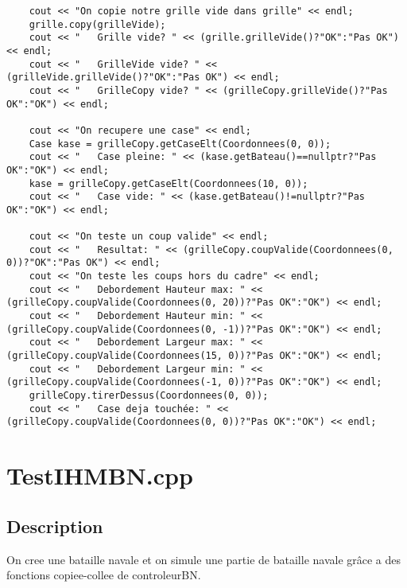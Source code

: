 \begin{lstlisting}
    cout << "On copie notre grille vide dans grille" << endl;
    grille.copy(grilleVide);
    cout << "   Grille vide? " << (grille.grilleVide()?"OK":"Pas OK") << endl;
    cout << "   GrilleVide vide? " << (grilleVide.grilleVide()?"OK":"Pas OK") << endl;
    cout << "   GrilleCopy vide? " << (grilleCopy.grilleVide()?"Pas OK":"OK") << endl;

    cout << "On recupere une case" << endl;
    Case kase = grilleCopy.getCaseElt(Coordonnees(0, 0));
    cout << "   Case pleine: " << (kase.getBateau()==nullptr?"Pas OK":"OK") << endl;
    kase = grilleCopy.getCaseElt(Coordonnees(10, 0));
    cout << "   Case vide: " << (kase.getBateau()!=nullptr?"Pas OK":"OK") << endl;

    cout << "On teste un coup valide" << endl;
    cout << "   Resultat: " << (grilleCopy.coupValide(Coordonnees(0, 0))?"OK":"Pas OK") << endl;
    cout << "On teste les coups hors du cadre" << endl;
    cout << "   Debordement Hauteur max: " << (grilleCopy.coupValide(Coordonnees(0, 20))?"Pas OK":"OK") << endl;
    cout << "   Debordement Hauteur min: " << (grilleCopy.coupValide(Coordonnees(0, -1))?"Pas OK":"OK") << endl;
    cout << "   Debordement Largeur max: " << (grilleCopy.coupValide(Coordonnees(15, 0))?"Pas OK":"OK") << endl;
    cout << "   Debordement Largeur min: " << (grilleCopy.coupValide(Coordonnees(-1, 0))?"Pas OK":"OK") << endl;
    grilleCopy.tirerDessus(Coordonnees(0, 0));
    cout << "   Case deja touchée: " << (grilleCopy.coupValide(Coordonnees(0, 0))?"Pas OK":"OK") << endl;	
	\end{lstlisting}
    \section{TestIHMBN.cpp}
        \subsection{Description}
            On cree une bataille navale et on simule une partie de bataille navale grâce a des fonctions copiee-collee de controleurBN.
